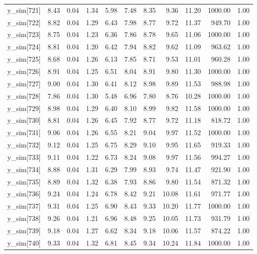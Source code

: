 \begin{table}[ht]
\begin{tabular}{rrrrrrrrrrr}
  y\_sim[721] & 8.43 & 0.04 & 1.34 & 5.98 & 7.48 & 8.35 & 9.36 & 11.20 & 1000.00 & 1.00 \\ 
  y\_sim[722] & 8.82 & 0.04 & 1.29 & 6.43 & 7.98 & 8.77 & 9.72 & 11.37 & 949.70 & 1.00 \\ 
  y\_sim[723] & 8.75 & 0.04 & 1.23 & 6.36 & 7.86 & 8.78 & 9.65 & 11.06 & 1000.00 & 1.00 \\ 
  y\_sim[724] & 8.81 & 0.04 & 1.20 & 6.42 & 7.94 & 8.82 & 9.62 & 11.09 & 963.62 & 1.00 \\ 
  y\_sim[725] & 8.68 & 0.04 & 1.26 & 6.13 & 7.85 & 8.71 & 9.53 & 11.01 & 960.28 & 1.00 \\ 
  y\_sim[726] & 8.91 & 0.04 & 1.25 & 6.51 & 8.04 & 8.91 & 9.80 & 11.30 & 1000.00 & 1.00 \\ 
  y\_sim[727] & 9.00 & 0.04 & 1.30 & 6.41 & 8.12 & 8.98 & 9.89 & 11.53 & 988.98 & 1.00 \\ 
  y\_sim[728] & 7.86 & 0.04 & 1.30 & 5.48 & 6.96 & 7.80 & 8.76 & 10.28 & 1000.00 & 1.00 \\ 
  y\_sim[729] & 8.98 & 0.04 & 1.29 & 6.40 & 8.10 & 8.99 & 9.82 & 11.58 & 1000.00 & 1.00 \\ 
  y\_sim[730] & 8.81 & 0.04 & 1.26 & 6.45 & 7.92 & 8.77 & 9.72 & 11.18 & 818.72 & 1.00 \\ 
  y\_sim[731] & 9.06 & 0.04 & 1.26 & 6.55 & 8.21 & 9.04 & 9.97 & 11.52 & 1000.00 & 1.00 \\ 
  y\_sim[732] & 9.12 & 0.04 & 1.25 & 6.75 & 8.29 & 9.10 & 9.95 & 11.65 & 919.33 & 1.00 \\ 
  y\_sim[733] & 9.11 & 0.04 & 1.22 & 6.73 & 8.24 & 9.08 & 9.97 & 11.56 & 994.27 & 1.00 \\ 
  y\_sim[734] & 8.88 & 0.04 & 1.31 & 6.29 & 7.99 & 8.93 & 9.74 & 11.47 & 921.90 & 1.00 \\ 
  y\_sim[735] & 8.89 & 0.04 & 1.32 & 6.38 & 7.93 & 8.86 & 9.80 & 11.54 & 871.32 & 1.00 \\ 
  y\_sim[736] & 9.24 & 0.04 & 1.24 & 6.78 & 8.42 & 9.21 & 10.08 & 11.61 & 971.77 & 1.00 \\ 
  y\_sim[737] & 9.31 & 0.04 & 1.25 & 6.90 & 8.43 & 9.33 & 10.20 & 11.77 & 1000.00 & 1.00 \\ 
  y\_sim[738] & 9.26 & 0.04 & 1.21 & 6.96 & 8.48 & 9.25 & 10.05 & 11.73 & 931.79 & 1.00 \\ 
  y\_sim[739] & 9.18 & 0.04 & 1.27 & 6.62 & 8.34 & 9.18 & 10.06 & 11.57 & 874.22 & 1.00 \\ 
  y\_sim[740] & 9.33 & 0.04 & 1.32 & 6.81 & 8.45 & 9.34 & 10.24 & 11.84 & 1000.00 & 1.00 \\ 

\end{tabular}
\end{table}
